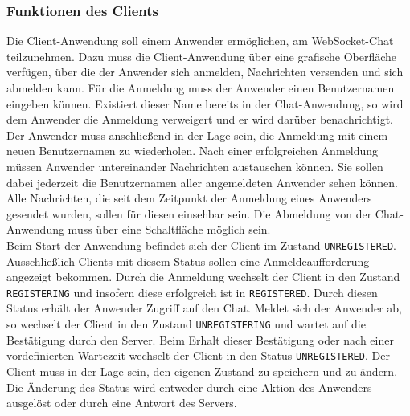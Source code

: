 \documentclass[11pt,a4paper,titlepage]{scrartcl}
\numberwithin{equation}{section}
\begin{document}
\subsubsection*{Funktionen des Clients}
Die Client-Anwendung soll einem Anwender ermöglichen, am WebSocket-Chat teilzunehmen. Dazu muss die Client-Anwendung über eine grafische Oberfläche verfügen, über die der Anwender sich anmelden, Nachrichten versenden und sich abmelden kann. Für die Anmeldung muss der Anwender einen Benutzernamen eingeben können. Existiert dieser Name bereits in der Chat-Anwendung, so wird dem Anwender die Anmeldung verweigert und er wird darüber benachrichtigt. Der Anwender muss anschließend in der Lage sein, die Anmeldung mit einem neuen Benutzernamen zu wiederholen. Nach einer erfolgreichen Anmeldung müssen Anwender untereinander Nachrichten austauschen können. Sie sollen dabei jederzeit die Benutzernamen aller angemeldeten Anwender sehen können. Alle Nachrichten, die seit dem Zeitpunkt der Anmeldung eines Anwenders gesendet wurden, sollen für diesen einsehbar sein. Die Abmeldung von der Chat-Anwendung muss über eine Schaltfläche möglich sein. \\

\noindent Beim Start der Anwendung befindet sich der Client im Zustand \texttt{UNREGISTERED}. Ausschließlich Clients mit diesem Status sollen eine Anmeldeaufforderung angezeigt bekommen. Durch die Anmeldung wechselt der Client in den Zustand \texttt{REGISTERING} und insofern diese erfolgreich ist in \texttt{REGISTERED}. Durch diesen Status erhält der Anwender Zugriff auf den Chat. Meldet sich der Anwender ab, so wechselt der Client in den Zustand \texttt{UNREGISTERING} und wartet auf die Bestätigung durch den Server. Beim Erhalt dieser Bestätigung oder nach einer vordefinierten Wartezeit wechselt der Client in den Status \texttt{UNREGISTERED}. Der Client muss in der Lage sein, den eigenen Zustand zu speichern und zu ändern. Die Änderung des Status wird entweder durch eine Aktion des Anwenders ausgelöst oder durch eine Antwort des Servers.   
\end{document}
